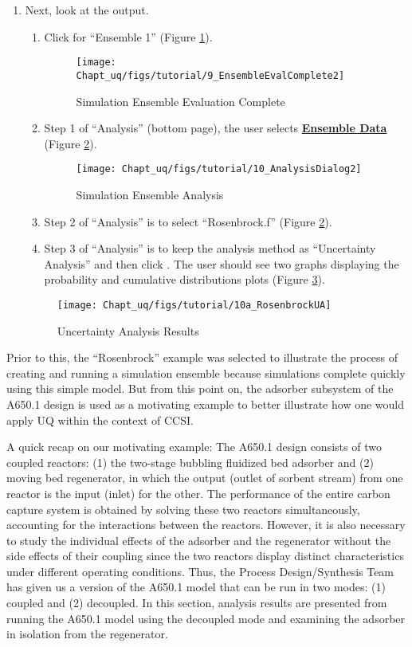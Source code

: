 \begin{enumerate}
\item Next, look at the output.
\begin{enumerate}
\item{Click  for ``Ensemble 1'' (Figure \ref{fig:uqt_ensem_complete}).}
\begin{figure}[H]
	\centering \texttt{[image: Chapt\_uq/figs/tutorial/9\_EnsembleEvalComplete2]}
	\caption{Simulation Ensemble Evaluation Complete}
	\label{fig:uqt_ensem_complete}
\end{figure}
\item{Step 1 of ``Analysis'' (bottom page), the user selects \textbf{\underline{Ensemble Data}} (Figure \ref{fig:uqt_analysis}).}
\begin{figure}[H]
	\centering \texttt{[image: Chapt\_uq/figs/tutorial/10\_AnalysisDialog2]}
	\caption{Simulation Ensemble Analysis}
	\label{fig:uqt_analysis}
\end{figure}
\item{Step 2 of ``Analysis'' is to select ``Rosenbrock.f'' (Figure \ref{fig:uqt_analysis}).}
\item{Step 3 of ``Analysis'' is to keep the analysis method as ``Uncertainty Analysis'' and then click . The user should see two graphs displaying the probability and cumulative distributions plots (Figure \ref{fig:10a.rosenua}).}
\end{enumerate}
\begin{figure}[H]
	\centering \texttt{[image: Chapt\_uq/figs/tutorial/10a\_RosenbrockUA]}
	\caption{Uncertainty Analysis Results}
	\label{fig:10a.rosenua}
\end{figure}


\end{enumerate}

Prior to this, the ``Rosenbrock'' example was selected to illustrate the process of creating and running a simulation ensemble because simulations complete quickly using this simple model. But from this point on, the adsorber subsystem of the A650.1 design is used as a motivating example to better illustrate how one would apply UQ within the context of CCSI.

A quick recap on our motivating example: The A650.1 design consists of two coupled reactors: (1) the two-stage bubbling fluidized bed adsorber and (2) moving bed regenerator, in which the output (outlet of sorbent stream) from one reactor is the input (inlet) for the other. The performance of the entire carbon capture system is obtained by solving these two reactors simultaneously, accounting for the interactions between the reactors. However, it is also necessary to study the individual effects of the adsorber and the regenerator without the side effects of their coupling since the two reactors display distinct characteristics under different operating conditions. Thus, the Process Design/Synthesis Team has given us a version of the A650.1 model that can be run in two modes: (1) coupled and (2) decoupled.
In this section, analysis results are presented from running the A650.1 model using the decoupled mode and examining the adsorber in isolation from the regenerator.
